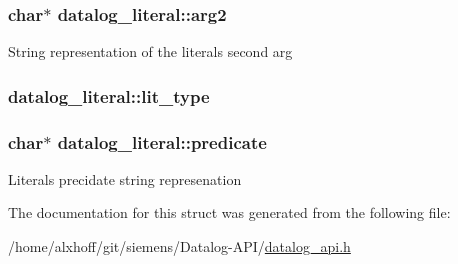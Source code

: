 \subsubsection[{\texorpdfstring{arg2}{arg2}}]{\setlength{\rightskip}{0pt plus 5cm}char$\ast$ datalog\+\_\+literal\+::arg2}\hypertarget{structdatalog__literal_a38e9dc36488ad4014bfb52027cc65cc9}{}\label{structdatalog__literal_a38e9dc36488ad4014bfb52027cc65cc9}
String representation of the literals second arg 
\subsubsection[{\texorpdfstring{lit\+\_\+type}{lit_type}}]{ datalog\+\_\+literal\+::lit\+\_\+type}\hypertarget{structdatalog__literal_a7fad52c17a15a69937de4e78746be12c}{}\label{structdatalog__literal_a7fad52c17a15a69937de4e78746be12c}
\subsubsection[{\texorpdfstring{predicate}{predicate}}]{\setlength{\rightskip}{0pt plus 5cm}char$\ast$ datalog\+\_\+literal\+::predicate}\hypertarget{structdatalog__literal_aad44475a0e606d9fd9c5e7aae3667412}{}\label{structdatalog__literal_aad44475a0e606d9fd9c5e7aae3667412}
Literal\textquotesingle{}s precidate string represenation 

The documentation for this struct was generated from the following file\+:\begin{DoxyCompactItemize}
\item 
/home/alxhoff/git/siemens/\+Datalog-\/\+A\+P\+I/\hyperlink{datalog__api_8h}{datalog\+\_\+api.\+h}\end{DoxyCompactItemize}
